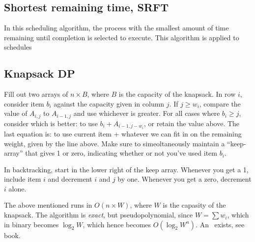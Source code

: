     \subsection{Shortest remaining time, SRFT}\label{sprt}
    In this scheduling algorithm, the process with the smallest amount of time
    remaining until completion is selected to execute.
    This algorithm is applied to~ schedules

\subsection{Knapsack DP}
    Fill out two arrays of $n \times B$, where $B$ is the capacity of 
    the knapsack. In row $i$, consider item $b_{i}$ against the capacity given
    in column $j$. If $j \geq w_{i}$, compare the value of $A_{i,j}$ to 
    $A_{i-1,j}$ and use whichever is greater. For all cases where $b_{i} \geq
    j$, consider which is better: to use $b_{i} + A_{i-1,j-w_{i}}$,
    or retain the value above. The last equation is: to use current item + 
    whatever we can fit in on the remaining weight, given by the line above.
    Make sure to simeoltaneously maintain a ``keep-array'' that gives 1 or zero,
    indicating whether or not you've used item $b_{i}$.

    In backtracking, start in the lower right of the keep array.
    Whenever you get a 1, include item $i$ and decrement $i$ and $j$ by one.
    Whenever you get a zero, decrement $i$ alone.

    The above mentioned runs in $O(n\times W)$, where $W$ is the capasity of 
    the knapsack. The algorithm is \textit{exact}, but pseudopolynomial, since
    $W = \sum{w_{i}}$, which in binary becomes $\log_{2} W$, which hence 
    becomes $O(\log_{2}W^{n})$. An~ exists, see book.
